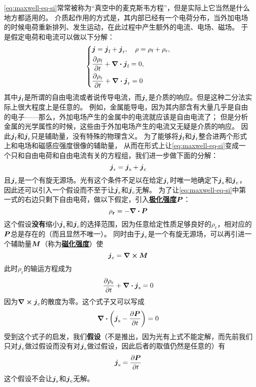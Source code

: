 \documentclass[UTF8, a4paper]{ctexart}
\renewcommand{\emph}[1]{\textbf{#1}}
\newcommand*{\concept}[1]{\underline{\textbf{#1}}}
\begin{document}
\eqref{eq:maxwell-eq-si}常常被称为“真空中的麦克斯韦方程”，但是实际上它当然是什么地方都适用的。
介质起作用的方式是，其内部已经有一个电荷分布，当外加电场的时候电荷重新排列、发生运动，在此过程中产生额外的电流、电场、磁场。
于是假定电荷和电流可以做以下分解：
\[
    \left\{
        \begin{aligned}
            &\vb*{j} = \vb*{j}_\text{f} + \vb*{j}_\text{r}, \quad \rho = \rho_\text{f} + \rho_\text{r}, \\
            &\pdv{\rho_\text{f}}{t} + \div{\vb*{j}_\text{f}} = 0, \\
            &\pdv{\rho_\text{r}}{t} + \div{\vb*{j}_\text{r}} = 0
        \end{aligned}
    \right.
\]
其中$\vb*{j}_\text{f}$是所谓的自由电流或者说传导电流，而$\vb*{j}_\text{r}$是介质的响应。但是这种二分法实际上很大程度上是任意的。
例如，金属能导电，因为其内部含有大量几乎是自由的电子——那么，外加电场产生的金属中的电流就应该是自由电流了；
但是分析金属的光学属性的时候，这些由于外加电场产生的电流又无疑是介质的响应。
因此$\vb*{j}_\text{f}$和$\vb*{j}_\text{r}$只是辅助量，没有特殊的物理含义。
为了能够将$\vb*{j}_\text{f}$和$\vb*{j}_\text{r}$整合进两个形式上和电场和磁感应强度很像的辅助量，
从而在形式上让\eqref{eq:maxwell-eq-si}变成一个只和自由电荷和自由电流有关的方程组，我们进一步做下面的分解：
\[
    \vb*{j}_\text{r} = \vb*{j}_\text{s} + \vb*{j}_\text{c}
\]
且$\vb*{j}_\text{c}$是一个有旋无源场。光有这个条件不足以在给定$\vb*{j}_\text{r}$时唯一地确定下$\vb*{j}_\text{s}$和$\vb*{j}_\text{c}$，
因此还可以引入一个假设而不至于让$\vb*{j}_\text{s}$和$\vb*{j}_\text{c}$无解。
为了让\eqref{eq:maxwell-eq-si}中第一式的右边只剩下自由电荷，做以下假定，引入\concept{极化强度}$\vb*{P}$：
\[
    \rho_\textbf{r} = - \div{\vb*{P}}
\]
这个假设\emph{没有}缩小$\vb*{j}_\text{s}$和$\vb*{j}_\text{c}$的选择范围，因为任意给定性质足够良好的$\rho_\text{r}$，相对应的$\vb*{P}$总是存在的（而且显然不唯一）。
同时由于$\vb*{j}_\text{c}$是一个有旋无源场，可以再引进一个辅助量$\vb*{M}$（称为\concept{磁化强度}）使
\[
    \vb*{j}_\text{c} = \curl{\vb*{M}}
\]
此时$\rho_\text{r}$的输运方程成为
\[
    \pdv{\rho_\text{r}}{t} + \div{\vb*{j}_\text{s}} = 0
\]
因为$\curl{\vb*{j}_\text{c}}$的散度为零。这个式子又可以写成
\[
    \div{\left(\vb*{j}_\text{s}-\pdv{\vb*{P}}{t}\right)} = 0
\]
受到这个式子的启发，我们\emph{假设}（不是推出，因为光有上式不能定解，而先前我们只对$\vb*{j}_\text{c}$做过假设而没有对$\vb*{j}_\text{s}$做过假设，因此后者的取值仍然是任意的）有
\[
    \vb*{j}_\text{s} = \pdv{\vb*{P}}{t}
\]
这个假设不会让$\vb*{j}_\text{s}$和$\vb*{j}_\text{c}$无解。
\end{document}
